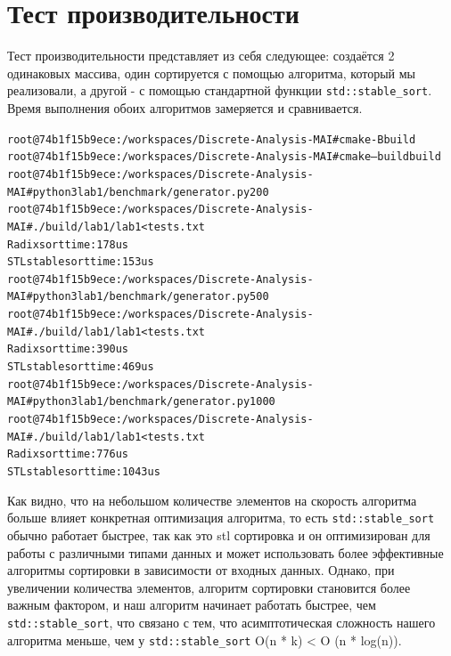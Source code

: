 \section{Тест производительности}

Тест производительности представляет из себя следующее: создаётся 2 одинаковых массива, один сортируется с помощью алгоритма, который мы реализовали, а другой - с помощью стандартной функции \texttt{std::stable\_sort}. Время выполнения обоих алгоритмов замеряется и сравнивается.

\begin{alltt}
root@74b1f15b9ece:/workspaces/Discrete-Analysis-MAI# cmake -B build
root@74b1f15b9ece:/workspaces/Discrete-Analysis-MAI# cmake --build build
root@74b1f15b9ece:/workspaces/Discrete-Analysis-MAI# python3 lab1/benchmark/generator.py 200
root@74b1f15b9ece:/workspaces/Discrete-Analysis-MAI# ./build/lab1/lab1 < tests.txt
Radix sort time: 178us
STL stable sort time: 153us
root@74b1f15b9ece:/workspaces/Discrete-Analysis-MAI# python3 lab1/benchmark/generator.py 500
root@74b1f15b9ece:/workspaces/Discrete-Analysis-MAI# ./build/lab1/lab1 < tests.txt
Radix sort time: 390us
STL stable sort time: 469us
root@74b1f15b9ece:/workspaces/Discrete-Analysis-MAI# python3 lab1/benchmark/generator.py 1000
root@74b1f15b9ece:/workspaces/Discrete-Analysis-MAI# ./build/lab1/lab1 < tests.txt
Radix sort time: 776us
STL stable sort time: 1043us
\end{alltt}

Как видно, что на небольшом количестве элементов на скорость алгоритма больше влияет конкретная оптимизация алгоритма, то есть \texttt{std::stable\_sort} обычно работает быстрее, так как это stl сортировка и он оптимизирован для работы с различными типами данных и может использовать более эффективные алгоритмы сортировки в зависимости от входных данных. Однако, при увеличении количества элементов, алгоритм сортировки становится более важным фактором, и наш алгоритм начинает работать быстрее, чем \texttt{std::stable\_sort}, что связано с тем, что асимптотическая сложность нашего алгоритма меньше, чем у \texttt{std::stable\_sort} O(n * k) < O (n * log(n)).

\pagebreak